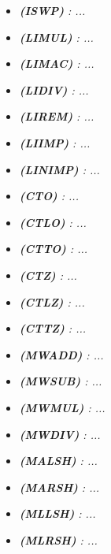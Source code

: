 \begin{multicols}{2}
\begin{itemize}
                \item \textit{\textbf{(ISWP) }: ...}

                \item \textit{\textbf{(LIMUL) }: ...}

                \item \textit{\textbf{(LIMAC) }: ...}
                
                \item \textit{\textbf{(LIDIV) }: ...}

                \item \textit{\textbf{(LIREM) }: ...}

                \item \textit{\textbf{(LIIMP) }: ...}

                \item \textit{\textbf{(LINIMP) }: ...}
                
                \item \textit{\textbf{(CTO) }: ...}

                \item \textit{\textbf{(CTLO) }: ...}

                \item \textit{\textbf{(CTTO) }: ...}

                \item \textit{\textbf{(CTZ) }: ...}
                
                \item \textit{\textbf{(CTLZ) }: ...}

                \item \textit{\textbf{(CTTZ) }: ...}

                \item \textit{\textbf{(MWADD) }: ...}

                \item \textit{\textbf{(MWSUB) }: ...}
                
                \item \textit{\textbf{(MWMUL) }: ...}

                \item \textit{\textbf{(MWDIV) }: ...}

                \item \textit{\textbf{(MALSH) }: ...}

                \item \textit{\textbf{(MARSH) }: ...}

                \item \textit{\textbf{(MLLSH) }: ...}
                
                \item \textit{\textbf{(MLRSH) }: ...}

            \end{itemize}  

        \end{multicols}

